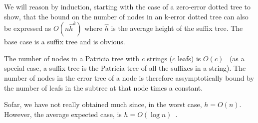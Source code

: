 We will reason by induction, starting with the case of a zero-error dotted tree to show, that the bound on the number of nodes in an k-error dotted tree can also be expressed as $O(n\hat{h}^k)$ where $\hat{h}$ is the average height of the suffix tree. The base case is a suffix tree and is obvious.

The number of nodes in a Patricia tree with $c$ strings ($c$ leafs) is $O(c)$~\cite{patricia} (as a special case, a suffix tree is the Patricia tree of all the suffixes in a string). The number of nodes in the error tree of a node is therefore assymptotically bound by the number of leafs in the subtree at that node times a constant.




Sofar, we have not really obtained much since, in the worst case, $h=O(n)$. However, the average expected case, is $h=O(\log n)$~\cite{devroye:note,szpankowski:unexpected}.

